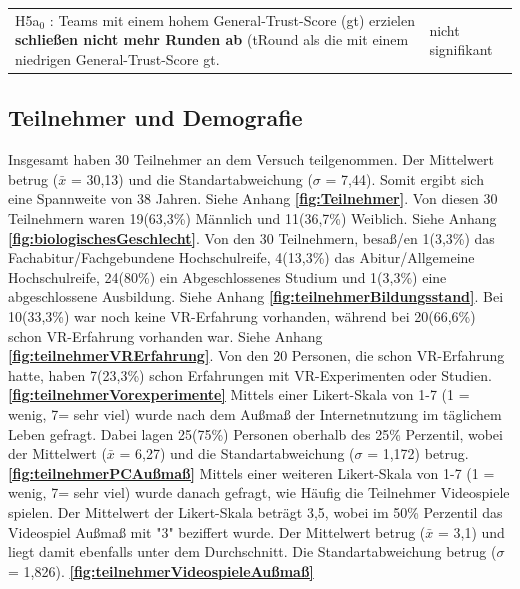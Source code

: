 \documentclass[a4paper,11pt]{article}%
\renewcommand{\\}{\vspace*{0.5\baselineskip} \newline}
\begin{document}
\begin{table}[H]
\begin{tabularx}{\textwidth}{p{12cm} | p{3.5cm}}
		\hline 	\\
		
		H5a$_{0}$ : Teams mit einem hohem General-Trust-Score (\ac{gt}) erzielen \textbf{schließen nicht mehr Runden ab} (\ac{tRound} als die mit einem niedrigen General-Trust-Score \ac{gt}.\\		
		& nicht signifikant \\
		
		\hline 	\\
	\end{tabularx}
\end{table}		

\newpage

	\subsection{Teilnehmer und Demografie}
Insgesamt haben 30 Teilnehmer an dem Versuch teilgenommen. Der Mittelwert betrug ($\bar{x}$ = 30,13) und die Standartabweichung ($\sigma$ = 7,44). Somit ergibt sich eine Spannweite von 38 Jahren. Siehe Anhang \textbf{\autoref{fig:Teilnehmer}}.\\
Von diesen 30 Teilnehmern waren 19(63,3\%) Männlich und 11(36,7\%) Weiblich. Siehe Anhang \textbf{\autoref{fig:biologischesGeschlecht}}.\\
Von den 30 Teilnehmern, besaß/en 1(3,3\%) das Fachabitur/Fachgebundene Hochschulreife, 4(13,3\%) das Abitur/Allgemeine Hochschulreife, 24(80\%) ein Abgeschlossenes Studium und 1(3,3\%) eine abgeschlossene Ausbildung. Siehe Anhang \textbf{\autoref{fig:teilnehmerBildungsstand}}.\\
Bei 10(33,3\%) war noch keine VR-Erfahrung vorhanden, während bei 20(66,6\%) schon VR-Erfahrung vorhanden war. Siehe Anhang \textbf{\autoref{fig:teilnehmerVRErfahrung}}.\\ 
Von den 20 Personen, die schon VR-Erfahrung hatte, haben 7(23,3\%) schon Erfahrungen mit VR-Experimenten oder Studien. \textbf{\autoref{fig:teilnehmerVorexperimente}} \\
Mittels einer Likert-Skala von 1-7 (1 = wenig, 7= sehr viel) wurde nach dem Außmaß der Internetnutzung im täglichem Leben gefragt. Dabei lagen 25(75\%) Personen oberhalb des 25\% Perzentil, wobei der Mittelwert ($\bar{x}$ = 6,27) und die Standartabweichung ($\sigma$ = 1,172) betrug. \textbf{\autoref{fig:teilnehmerPCAußmaß}} \\ 
Mittels einer weiteren Likert-Skala von 1-7 (1 = wenig, 7= sehr viel) wurde danach gefragt, wie Häufig die Teilnehmer Videospiele spielen. Der Mittelwert der Likert-Skala beträgt 3,5, wobei im 50\% Perzentil das Videospiel Außmaß mit "3" beziffert wurde. Der Mittelwert betrug ($\bar{x}$ = 3,1) und liegt damit ebenfalls unter dem Durchschnitt. Die Standartabweichung betrug ($\sigma$ = 1,826). \textbf{\autoref{fig:teilnehmerVideospieleAußmaß}}
\end{document}

